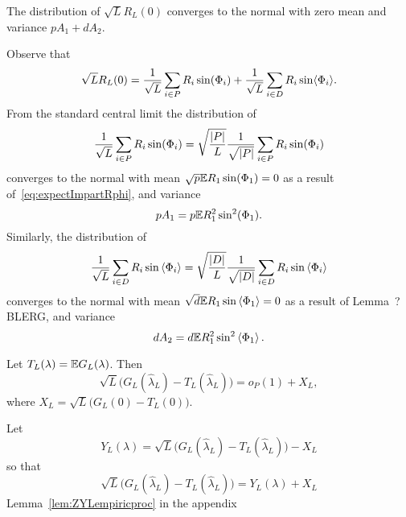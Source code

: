 \documentclass[journal]{IEEEtran}
\begin{document}
\begin{lemma}\label{lem:convdistGLdash}
The distribution of $\sqrt{L}R_L(0)$ converges to the normal with zero mean and variance $pA_1 + dA_2$.
\end{lemma}
\begin{IEEEproof}
Observe that 
\[
\sqrt{L} R_L(0) = \frac{1}{\sqrt{L}} \sum_{i \in P} R_i \sin(\Phi_i) + \frac{1}{\sqrt{L}} \sum_{i \in D} R_i \sin\langle \Phi_i \rangle.
\]
From the standard central limit the distribution of
\[
\frac{1}{\sqrt{L}} \sum_{i \in P} R_i \sin(\Phi_i) = \sqrt{\frac{{\vert P \vert}}{L}} \frac{1}{\sqrt{{\vert P \vert}}} \sum_{i \in P} R_i \sin(\Phi_i) 
\]
converges to the normal with mean $\sqrt{p}{\mathbb E} R_1 \sin(\Phi_1) = 0$ as a result of~\eqref{eq:expectImpartRphi}, and variance
\[
p A_1 = p {\mathbb E} R_1^2 \sin^2(\Phi_1).
\]
Similarly, the distribution of 
\[ 
\frac{1}{\sqrt{L}} \sum_{i \in D} R_i \sin\left\langle \Phi_i \right\rangle = \sqrt{\frac{{\vert D \vert}}{L}} \frac{1}{\sqrt{{\vert D \vert}}} \sum_{i \in D} R_i \sin\left\langle \Phi_i \right\rangle 
\]
converges to the normal with mean $\sqrt{d}{\mathbb E} R_1 \sin\left\langle \Phi_1 \right\rangle = 0$ as a result of Lemma~? BLERG, and variance
\[
d A_2 = d {\mathbb E} R_1^2 \sin^2\left\langle \Phi_1 \right\rangle.
\]
\end{IEEEproof}


\begin{lemma}\label{lem:empiricprocforrho} Let $T_L(\lambda) = {\mathbb E} G_L(\lambda)$.  Then
\[
\sqrt{L}\big( G_L(\hat{\lambda}_L) - T_L(\hat{\lambda}_L) \big) = o_P(1) + X_L,
\]
where $X_L = \sqrt{L} \big( G_L(0) - T_L(0) \big)$.
\end{lemma}
\begin{IEEEproof}
Let
\begin{equation}\label{eq:YLdef}
Y_L(\lambda) = \sqrt{L}\big( G_L(\hat{\lambda}_L) - T_L(\hat{\lambda}_L) \big) - X_L
\end{equation}
so that
\[
\sqrt{L}\big( G_L(\hat{\lambda}_L) - T_L(\hat{\lambda}_L) \big) = Y_L(\lambda) + X_L
\]
Lemma~\ref{lem:ZYLempiricproc} in the appendix 
\end{IEEEproof}
\end{document}
